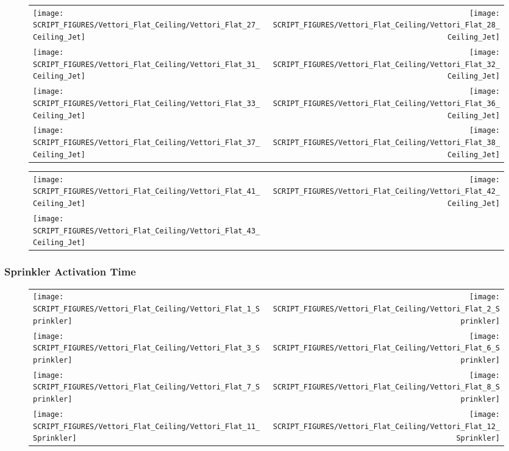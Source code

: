 \begin{figure}[!ht]
\begin{tabular*}{\textwidth}{l@{\extracolsep{\fill}}r}
\texttt{[image: SCRIPT\_FIGURES/Vettori\_Flat\_Ceiling/Vettori\_Flat\_27\_Ceiling\_Jet]} &
\texttt{[image: SCRIPT\_FIGURES/Vettori\_Flat\_Ceiling/Vettori\_Flat\_28\_Ceiling\_Jet]} \\
\texttt{[image: SCRIPT\_FIGURES/Vettori\_Flat\_Ceiling/Vettori\_Flat\_31\_Ceiling\_Jet]} &
\texttt{[image: SCRIPT\_FIGURES/Vettori\_Flat\_Ceiling/Vettori\_Flat\_32\_Ceiling\_Jet]} \\
\texttt{[image: SCRIPT\_FIGURES/Vettori\_Flat\_Ceiling/Vettori\_Flat\_33\_Ceiling\_Jet]} &
\texttt{[image: SCRIPT\_FIGURES/Vettori\_Flat\_Ceiling/Vettori\_Flat\_36\_Ceiling\_Jet]} \\
\texttt{[image: SCRIPT\_FIGURES/Vettori\_Flat\_Ceiling/Vettori\_Flat\_37\_Ceiling\_Jet]} &
\texttt{[image: SCRIPT\_FIGURES/Vettori\_Flat\_Ceiling/Vettori\_Flat\_38\_Ceiling\_Jet]}
\end{tabular*}
\end{figure}

\begin{figure}[!ht]
\begin{tabular*}{\textwidth}{l@{\extracolsep{\fill}}r}
\texttt{[image: SCRIPT\_FIGURES/Vettori\_Flat\_Ceiling/Vettori\_Flat\_41\_Ceiling\_Jet]} &
\texttt{[image: SCRIPT\_FIGURES/Vettori\_Flat\_Ceiling/Vettori\_Flat\_42\_Ceiling\_Jet]} \\
\texttt{[image: SCRIPT\_FIGURES/Vettori\_Flat\_Ceiling/Vettori\_Flat\_43\_Ceiling\_Jet]}
\end{tabular*}
\end{figure}

\clearpage

\subsubsection{Sprinkler Activation Time}

\begin{figure}[!ht]
\begin{tabular*}{\textwidth}{l@{\extracolsep{\fill}}r}
\texttt{[image: SCRIPT\_FIGURES/Vettori\_Flat\_Ceiling/Vettori\_Flat\_1\_Sprinkler]} &
\texttt{[image: SCRIPT\_FIGURES/Vettori\_Flat\_Ceiling/Vettori\_Flat\_2\_Sprinkler]} \\
\texttt{[image: SCRIPT\_FIGURES/Vettori\_Flat\_Ceiling/Vettori\_Flat\_3\_Sprinkler]} &
\texttt{[image: SCRIPT\_FIGURES/Vettori\_Flat\_Ceiling/Vettori\_Flat\_6\_Sprinkler]} \\
\texttt{[image: SCRIPT\_FIGURES/Vettori\_Flat\_Ceiling/Vettori\_Flat\_7\_Sprinkler]} &
\texttt{[image: SCRIPT\_FIGURES/Vettori\_Flat\_Ceiling/Vettori\_Flat\_8\_Sprinkler]} \\
\texttt{[image: SCRIPT\_FIGURES/Vettori\_Flat\_Ceiling/Vettori\_Flat\_11\_Sprinkler]} &
\texttt{[image: SCRIPT\_FIGURES/Vettori\_Flat\_Ceiling/Vettori\_Flat\_12\_Sprinkler]}
\end{tabular*}
\end{figure}

